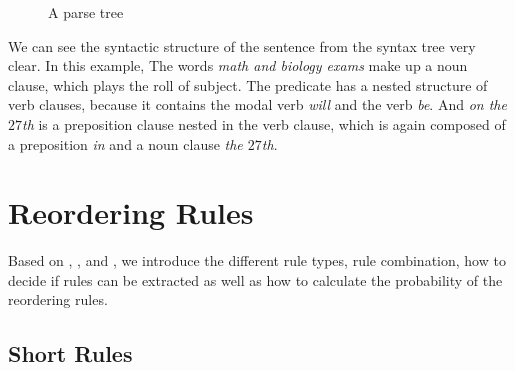 \begin{figure}
\centering
\scalebox{0.7}{}
\caption{A parse tree}
\label{ParseTree}
\end{figure}

We can see the syntactic structure of the sentence from the syntax tree very clear. In this example, The words \emph{math and biology exams} make up a noun clause, which plays the roll of subject. The predicate has a nested structure of verb clauses, because it contains the modal verb \emph{will} and the verb \emph{be}. And \emph{on the $27$th} is a preposition clause nested in the verb clause, which is again composed of a preposition \emph{in} and a noun clause \emph{the $27$th}.


\section{Reordering Rules}
\label{ch:Foundations:sec:types}

Based on \cite{short}, \cite{long}, \cite{tree} and \cite{combine}, we introduce the different rule types, rule combination, how to decide if rules can be extracted as well as how to calculate the probability of the reordering rules.

\subsection{Short Rules}


